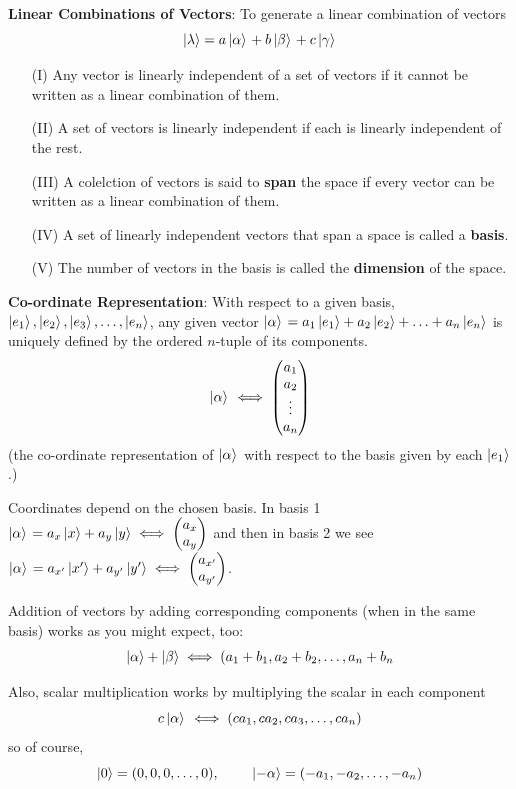 \documentclass[english, 11pt]{article}
\begin{document}
        {\bf Linear Combinations of Vectors}: To generate a linear combination of vectors
        \[ \left|\lambda\right\rangle = a\left| \alpha \rangle \right. + b\left| \beta \rangle \right. + c\left| \gamma \rangle \right. \]
        \begin{itemize}
          \item[(I)] Any vector is linearly independent of a set of vectors if it cannot be written as a linear combination of them.
          \item[(II)] A set of vectors is linearly independent if each is linearly independent of the rest.
          \item[(III)] A colelction of vectors is said to {\bf span} the space if every vector can be written as a linear combination of them.
          \item[(IV)] A set of linearly independent vectors that span a space is called a {\bf basis}.
          \item[(V)] The number of vectors in the basis is called the {\bf dimension} of the space.\newline
        \end{itemize}

        {\bf Co-ordinate Representation}: With respect to a given basis, $\left|e_1\right\rangle, \left|e_2\right\rangle, \left|e_3\right\rangle, \hdots, \left|e_n\right\rangle$, any given vector $\left| \alpha \rangle \right. = a_1 \left|e_1\right\rangle + a_2\left|e_2\right\rangle + \hdots + a_n \left|e_n\right\rangle$ is uniquely defined by the ordered $n$-tuple of its components.
        \[ \left| \alpha \rangle \right. \iff \left(\begin{matrix}a_1 \\ a_2 \\ \vdots \\ a_n\end{matrix}\right) \]
        (the co-ordinate representation of $\left| \alpha \rangle \right.$ with respect to the basis given by each $\left|e_1\right\rangle$.)

        Coordinates depend on the chosen basis. In basis 1 $\left| \alpha \rangle \right. = a_x\left|x\right\rangle + a_y\left|y\right\rangle \iff \left(\begin{matrix}a_x \\ a_y \end{matrix}\right)$ and then in basis 2 we see $\left| \alpha \rangle \right. = a_{x'}\left|x'\right\rangle + a_{y'}\left|y'\right\rangle \iff \left(\begin{matrix}a_{x'} \\ a_{y'}\end{matrix}\right)$. \newline

        Addition of vectors by adding corresponding components (when in the same basis) works as you might expect, too:
        \[ \left|\alpha\right\rangle + \left|\beta\right\rangle \iff (a_1 + b_1, a_2 + b_2, \hdots, a_n + b_n \]

        Also, scalar multiplication works by multiplying the scalar in each component
        \[ c\left| \alpha \rangle \right. \iff (ca_1, ca_2, ca_3, \ldots, ca_n) \]
        so of course,
        \[ \ket{0} = (0, 0, 0, \ldots, 0),  \ \ \ \ \ \ \  \ket{-\alpha} = (-a_1, -a_2, \ldots, -a_n) \]
\end{document}
